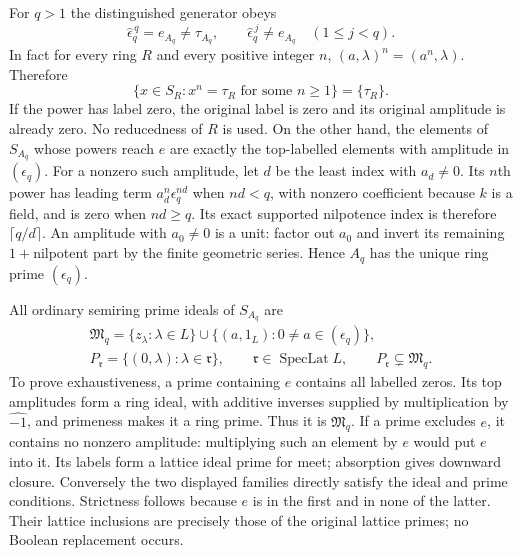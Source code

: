 For $q>1$ the distinguished generator obeys
\begin{equation}\tag{CFP14}
 \widehat\epsilon_q^{\,q}=e_{A_q}\ne\tau_{A_q},\qquad
 \widehat\epsilon_q^{\,j}\ne e_{A_q}\quad(1\le j<q).
\end{equation}
In fact for every ring $R$ and every positive integer $n$,
$(a,\lambda)^n=(a^n,\lambda)$. Therefore
\begin{equation}\tag{CFP15}
 \{x\in S_R:x^n=\tau_R\text{ for some }n\ge1\}=\{\tau_R\}.
\end{equation}
If the power has label zero, the original label is
zero and its original amplitude is already zero.
No reducedness of $R$ is used. On the other hand,
the elements of $S_{A_q}$ whose powers reach $e$
are exactly the top-labelled elements with amplitude
in $(\epsilon_q)$. For a nonzero such amplitude,
let $d$ be the least index with $a_d\ne0$.
Its $n$th power has leading term
$a_d^n\epsilon_q^{nd}$ when $nd<q$, with nonzero
coefficient because $k$ is a field, and is zero
when $nd\ge q$. Its exact supported nilpotence
index is therefore $\lceil q/d\rceil$.
An amplitude with $a_0\ne0$ is a unit: factor
out $a_0$ and invert its remaining $1+$nilpotent
part by the finite geometric series. Hence
$A_q$ has the unique ring prime $(\epsilon_q)$.

All ordinary semiring prime ideals of $S_{A_q}$ are
\begin{equation}\tag{CFP16}
\begin{gathered}
 \mathfrak M_q=\{z_\lambda:\lambda\in L\}
                  \cup\{(a,1_L):0\ne a\in(\epsilon_q)\},\\
 P_{\mathfrak r}=\{(0,\lambda):\lambda\in\mathfrak r\},
               \qquad\mathfrak r\in\operatorname{SpecLat}L,
 \qquad P_{\mathfrak r}\subsetneq\mathfrak M_q.
\end{gathered}
\end{equation}
To prove exhaustiveness, a prime containing $e$
contains all labelled zeros. Its top amplitudes
form a ring ideal, with additive inverses supplied
by multiplication by $\widehat{-1}$, and primeness
makes it a ring prime. Thus it is $\mathfrak M_q$.
If a prime excludes $e$, it contains no nonzero
amplitude: multiplying such an element by $e$
would put $e$ into it. Its labels form a lattice
ideal prime for meet; absorption gives downward
closure. Conversely the two displayed families
directly satisfy the ideal and prime conditions.
Strictness follows because $e$ is in the first
and in none of the latter. Their lattice
inclusions are precisely those of the original
lattice primes; no Boolean replacement occurs.

